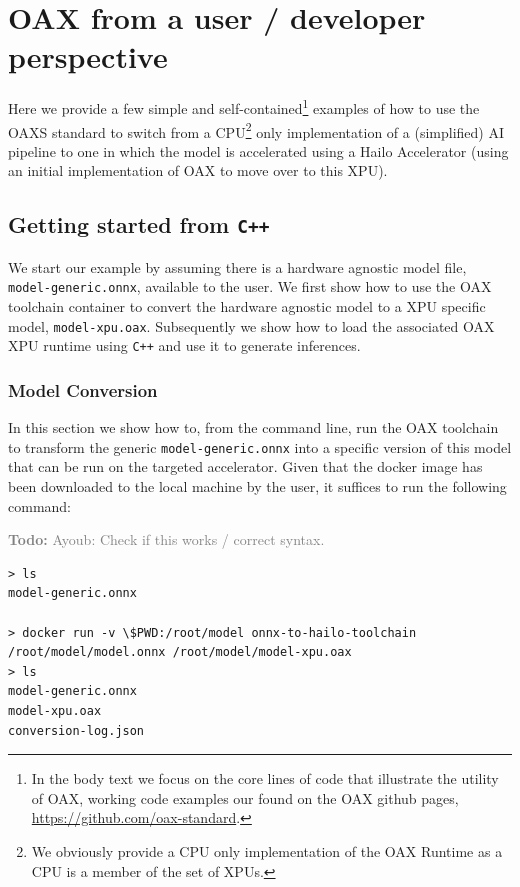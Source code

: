 \documentclass{article}
\newcommand{\todo}[1]{\textcolor{gray}{\textbf{Todo:} #1}}
\newcommand{\oaxgit}{\href{https://github.com/oax-standard}{https://github.com/oax-standard}}
\begin{document}
\section{OAX from a user / developer perspective}

Here we provide a few simple and self-contained\footnote{In the body text we focus on the core lines of code that illustrate the utility of OAX, working code examples our found on the OAX github pages, \oaxgit.} examples of how to use the OAXS standard to switch from a CPU\footnote{We obviously provide a CPU only implementation of the OAX Runtime as a CPU is a member of the set of XPUs.} only implementation of a (simplified) AI pipeline to one in which the model is accelerated using a Hailo Accelerator (using an initial implementation of OAX to move over to this XPU). %

\subsection{Getting started from \texttt{C++}}

We start our example by assuming there is a hardware agnostic model file, \texttt{model-generic.onnx}, available to the user. We first show how to use the OAX toolchain container to convert the hardware agnostic model to a XPU specific model, \texttt{model-xpu.oax}. Subsequently we show how to load the associated OAX XPU runtime using \texttt{C++} and use it to generate inferences.

\subsubsection{Model Conversion}

In this section we show how to, from the command line, run the OAX toolchain to transform the generic \texttt{model-generic.onnx} into a specific version of this model that can be run on the targeted accelerator. Given that the docker image has been downloaded to the local machine by the user, it suffices to run the following command:

\todo{Ayoub: Check if this works / correct syntax.}

\begin{lstlisting}
> ls
model-generic.onnx

> docker run -v \$PWD:/root/model onnx-to-hailo-toolchain /root/model/model.onnx /root/model/model-xpu.oax
> ls
model-generic.onnx
model-xpu.oax
conversion-log.json
\end{lstlisting}
\end{document}
